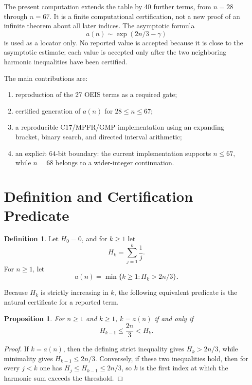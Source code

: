 \documentclass[11pt]{article}
\newtheorem{proposition}[theorem]{Proposition}
\theoremstyle{definition}
\newtheorem{definition}[theorem]{Definition}
\theoremstyle{remark}
\begin{document}
The present computation extends the table by 40 further terms, from \(n=28\)
through \(n=67\).  It is a finite computational certification, not a new proof
of an infinite theorem about all later indices.  The asymptotic formula
\[
  a(n)\sim \exp(2n/3-\gamma)
\]
is used as a locator only.  No reported value is accepted because it is close
to the asymptotic estimate; each value is accepted only after the two
neighboring harmonic inequalities have been certified.

The main contributions are:
\begin{enumerate}
\item reproduction of the 27 OEIS terms as a required gate;
\item certified generation of \(a(n)\) for \(28\leq n\leq 67\);
\item a reproducible C17/MPFR/GMP implementation using an expanding bracket,
      binary search, and directed interval arithmetic;
\item an explicit \(64\)-bit boundary: the current implementation supports
      \(n\leq 67\), while \(n=68\) belongs to a wider-integer continuation.
\end{enumerate}

\section{Definition and Certification Predicate}

\begin{definition}
Let \(H_0=0\), and for \(k\geq 1\) let
\[
  H_k=\sum_{j=1}^k \frac{1}{j}.
\]
For \(n\geq 1\), let
\[
  a(n)=\min\{k\geq 1: H_k>2n/3\}.
\]
\end{definition}

Because \(H_k\) is strictly increasing in \(k\), the following equivalent
predicate is the natural certificate for a reported term.

\begin{proposition}
\label{prop:certificate}
For \(n\geq 1\) and \(k\geq 1\), \(k=a(n)\) if and only if
\[
  H_{k-1}\leq \frac{2n}{3}<H_k.
\]
\end{proposition}

\begin{proof}
If \(k=a(n)\), then the defining strict inequality gives \(H_k>2n/3\), while
minimality gives \(H_{k-1}\leq 2n/3\).  Conversely, if these two inequalities
hold, then for every \(j<k\) one has \(H_j\leq H_{k-1}\leq 2n/3\), so \(k\) is
the first index at which the harmonic sum exceeds the threshold.
\end{proof}
\end{document}
